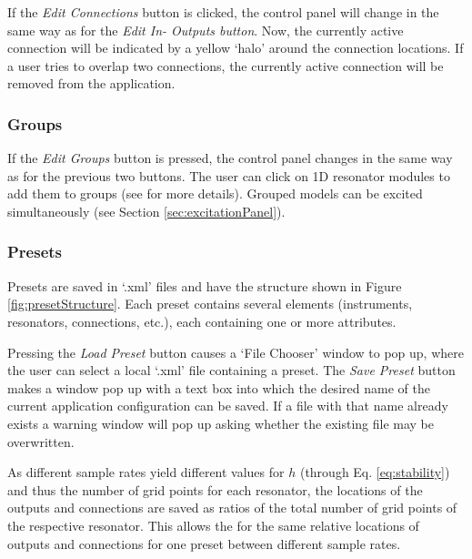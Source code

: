 \documentclass{article}
\begin{document}
If the \textit{Edit Connections} button is clicked, the control panel will change in the same way as for the \textit{Edit In- Outputs button}. Now, the currently active connection will be indicated by a yellow `halo' around the connection locations. If a user tries to overlap two connections, the currently active connection will be removed from the application.

\subsubsection{Groups}
If the \textit{Edit Groups} button is pressed, the control panel changes in the same way as for the previous two buttons.  The user can click on 1D resonator modules to add them to groups (see \cite{demo} for more details). Grouped models can be excited simultaneously (see Section \ref{sec:excitationPanel}).


\subsubsection{Presets}\label{sec:presets}
Presets are saved in `.xml' files and have the structure shown in Figure \ref{fig:presetStructure}. Each preset contains several elements (instruments, resonators, connections, etc.), each containing one or more attributes. 

Pressing the \textit{Load Preset} button causes a `File Chooser' window to pop up, where the user can select a local `.xml' file containing a preset. The \textit{Save Preset} button makes a window pop up with a text box into which the desired name of the current application configuration can be saved. If a file with that name already exists a warning window will pop up asking whether the existing file may be overwritten.

As different sample rates yield different values for $h$ (through Eq. \eqref{eq:stability}) and thus the number of grid points for each resonator, the locations of the outputs and connections are saved as ratios of the total number of grid points of the respective resonator. This allows the for the same relative locations of outputs and connections for one preset between different sample rates.
\end{document}

